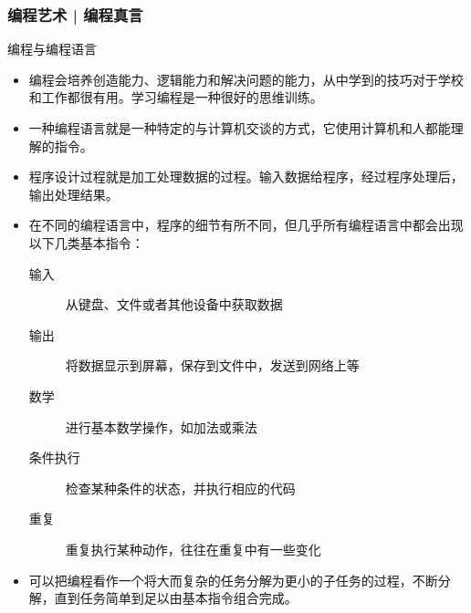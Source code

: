 \begin{frame}
  \frametitle{编程艺术 | 编程真言}
  {\footnotesize
  \begin{block}{编程与编程语言}
    \begin{itemize}
      \item 编程会培养\alert{创造能力、逻辑能力和解决问题的能力}，从中学到的技巧对于学校和工作都很有用。学习编程是一种很好的\alert{思维训练}。
      \item 一种编程语言就是一种特定的与计算机\alert{交谈的方式}，它使用计算机和人都能理解的指令。
      \item 程序设计过程就是\alert{加工处理数据}的过程。输入数据给程序，经过程序处理后，输出处理结果。
      \item 在不同的编程语言中，程序的细节有所不同，但几乎所有编程语言中都会出现以下几类\alert{基本指令}：
        \begin{description}
          \item[输入] 从键盘、文件或者其他设备中获取数据
          \item[输出] 将数据显示到屏幕，保存到文件中，发送到网络上等
          \item[数学] 进行基本数学操作，如加法或乘法
          \item[条件执行] 检查某种条件的状态，并执行相应的代码 
          \item[重复] 重复执行某种动作，往往在重复中有一些变化 
        \end{description}
      \item 可以把编程看作一个将大而复杂的任务分解为更小的子任务的过程，不断分解，直到任务简单到足以由基本指令组合完成。
    \end{itemize}
  \end{block}
}
\end{frame}

